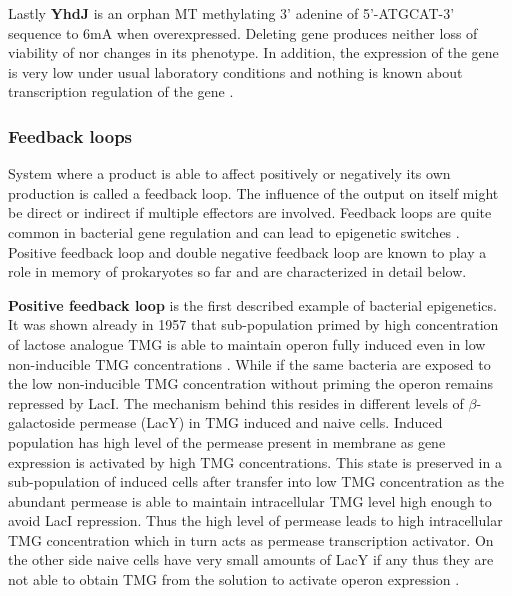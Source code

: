 Lastly \textbf{YhdJ} is an orphan MT methylating 3' adenine of 5'-ATGCAT-3' sequence to 6mA when overexpressed.
Deleting  gene produces neither loss of viability of  nor changes in its phenotype.
In addition, the expression of the gene is very low under usual laboratory conditions and nothing is known about transcription regulation of the gene \cite{broadbent2007yhdj}.

\subsubsection{Feedback loops}
System where a product is able to affect positively or negatively its own production is called a feedback loop.
The influence of the output on itself might be direct or indirect if multiple effectors are involved.
Feedback loops are quite common in bacterial gene regulation and can lead to epigenetic switches \cite{smits2006phenotypic, veening2008bistability}.
Positive feedback loop and double negative feedback loop are known to play a role in memory of prokaryotes so far and are characterized in detail below.

\textbf{Positive feedback loop} is the first described example of bacterial epigenetics.
It was shown already in 1957 that  sub-population primed by high concentration of lactose analogue TMG is able to maintain  operon fully induced even in low non-inducible TMG concentrations \cite{novick1957enzyme}.
While if the same bacteria are exposed to the low non-inducible TMG concentration without priming the  operon remains repressed by LacI.
The mechanism behind this resides in different levels of $\beta$-galactoside permease (LacY) in TMG induced and naive cells.
Induced population has high level of the permease present in membrane as  gene expression is activated by high TMG concentrations.
This state is preserved in a sub-population of induced cells after transfer into low TMG concentration as the abundant permease is able to maintain intracellular TMG level high enough to avoid LacI repression.
Thus the high level of permease leads to high intracellular TMG concentration which in turn acts as permease transcription activator.
On the other side naive cells have very small amounts of LacY if any thus they are not able to obtain TMG from the solution to activate  operon expression \cite{smits2006phenotypic, casadesus2013programmed}.

